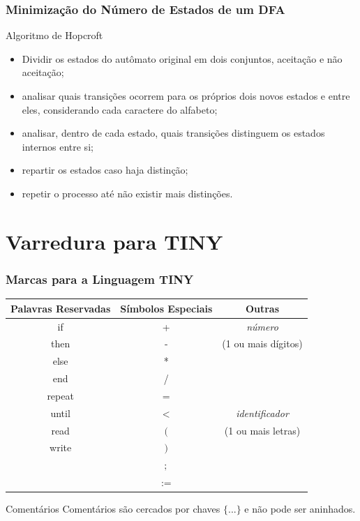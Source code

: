 \documentclass[table]{beamer}
\begin{document}
\begin{frame}
   \frametitle{Minimização do Número de Estados de um DFA}
   \begin{block}{Algoritmo de Hopcroft}
      \begin{itemize}
         \item Dividir os estados do autômato original em dois conjuntos, aceitação e não aceitação;
	 \item analisar quais transições ocorrem para os próprios dois novos estados e entre eles, considerando cada caractere do alfabeto;
	 \item analisar, dentro de cada estado, quais transições distinguem os estados internos entre si;
	 \item repartir os estados caso haja distinção;
	 \item repetir o processo até não existir mais distinções.
      \end{itemize}
   \end{block}
\end{frame}

\section{Varredura para TINY}
\begin{frame}
   \frametitle{Marcas para a Linguagem TINY}
\begin{table}
   \begin{tabular}{c|c|c}
   \hline
   Palavras Reservadas & Símbolos Especiais & Outras\\
   \hline 
   if & + & \textit{número} \\
   then & - & (1 ou mais dígitos) \\
   else & * & \\
   end & / & \\
   repeat & = & \\
   until & $<$ & \textit{identificador}\\
   read & $($ & (1 ou mais letras)\\
   write & $)$ & \\
   & $;$ & \\
   & $:=$ & \\
   \hline
   \end{tabular}
   \begin{block}{Comentários} 
   Comentários são cercados por chaves $\{$...$\}$ e não pode ser aninhados.
   \end{block}
\end{table}
\end{frame}
\end{document}
